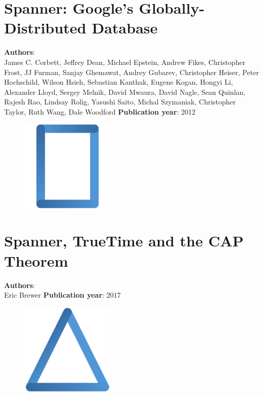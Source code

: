 \documentclass[11pt,fleqn]{book} %
\begin{document}
\chapter{Spanner: Google’s Globally-Distributed Database}
\vspace*{-7mm}
\Large \textbf{Authors}: \\
James C. Corbett, Jeffrey Dean, Michael Epstein, Andrew Fikes, Christopher Frost, JJ Furman, Sanjay Ghemawat, Andrey Gubarev, Christopher Heiser, Peter Hochschild, Wilson Hsieh, Sebastian Kanthak, Eugene Kogan, Hongyi Li, Alexander Lloyd, Sergey Melnik, David Mwaura, David Nagle, Sean Quinlan, Rajesh Rao, Lindsay Rolig, Yasushi Saito, Michal Szymaniak, Christopher Taylor, Ruth Wang, Dale Woodford
\newline\newline
\textbf{Publication year}: 2012
\begin{figure}[b]
    \centering
    \includegraphics[width=0.4\textwidth]{distributed-systems-rectangle-blue.pdf}
\end{figure}


\chapter{Spanner, TrueTime and the CAP Theorem}
\vspace*{-7mm}
\Large \textbf{Authors}: \\
Eric Brewer
\newline\newline
\textbf{Publication year}: 2017
\begin{figure}[b]
    \centering
    \includegraphics[width=0.4\textwidth]{distributed-systems-triangle-blue.pdf}
\end{figure}

\end{document}
